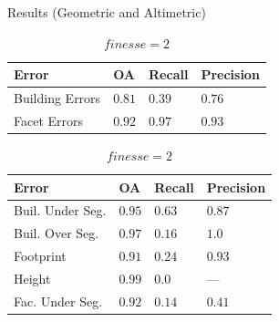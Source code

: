 \documentclass{beamer}
\begin{document}
            \begin{frame}[plain]{Results (Geometric and Altimetric)}
                \begin{table}
                    \begin{subtable}{.4\textwidth}
                        \tiny
                        \begin{center}
                            \begin{tabular}{x{1cm} x{.5cm} x{.5cm} x{.5cm}}
                                \toprule
                                {\bf Error} & {\bf OA} & {\bf Recall} & {\bf Precision} \\
                                \midrule
                                Building Errors & $0.81$ & $0.39$ & $0.76$ \\
                                \midrule
                                Facet Errors & $0.92$ & $0.97$ & $0.93$ \\
                                \bottomrule
                            \end{tabular}
                            \caption{\tiny\label{tab::finesse2} $finesse = 2$}
                        \end{center}
                    \end{subtable}
                    \begin{subtable}{.45\textwidth}
                        \tiny
                        \begin{center}
                            \begin{tabular}{x{1.75cm} x{.5cm} x{.5cm} x{.5cm}}
                                \toprule
                                {\bf Error} & {\bf OA} & {\bf Recall} & {\bf Precision} \\
                                \midrule
                                Buil. Under Seg. & $0.95$ & $0.63$ & $0.87$ \\
                                \midrule
                                Buil. Over Seg. & $0.97$ & $0.16$ & $1.0$ \\
                                \midrule
                                Footprint & $0.91$ & $0.24$ & $0.93$ \\
                                \midrule
                                Height & $0.99$ & $0.0$ & --- \\
                                \midrule
                                \midrule
                                Fac. Under Seg. & $0.92$ & $0.14$ & $0.41$ \\

\end{tabular}
\end{center}
\end{subtable}
\end{table}
\end{frame}
\end{document}
